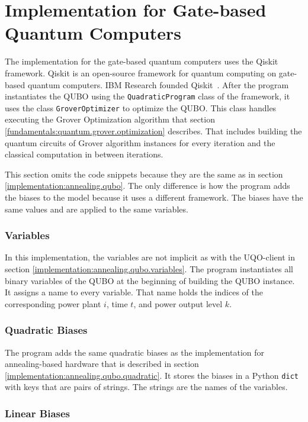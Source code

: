 \section{Implementation for Gate-based Quantum Computers}
\label{implement:gate.qubo}

The implementation for the gate-based quantum computers uses the Qiskit framework.
Qiskit is an open-source framework for quantum computing on gate-based quantum computers.
IBM Research founded Qiskit~\cite{QiskitWeb, QiskitGitHub}.
After the program instantiates the QUBO using the \texttt{QuadraticProgram} class of the framework, it uses the class \texttt{GroverOptimizer} to optimize the QUBO.
This class handles executing the Grover Optimization algorithm that section \ref{fundamentals:quantum.grover.optimization} describes.
That includes building the quantum circuits of Grover algorithm instances for every iteration and the classical computation in between iterations.

This section omits the code snippets because they are the same as in section \ref{implementation:annealing.qubo}.
The only difference is how the program adds the biases to the model because it uses a different framework.
The biases have the same values and are applied to the same variables.

\subsubsection{Variables}

In this implementation, the variables are not implicit as with the UQO-client in section \ref{implementation:annealing.qubo.variables}.
The program instantiates all binary variables of the QUBO at the beginning of building the QUBO instance.
It assigns a name to every variable.
That name holds the indices of the corresponding power plant $i$, time $t$, and power output level $k$.

\subsubsection{Quadratic Biases}

The program adds the same quadratic biases as the implementation for annealing-based hardware that is described in section \ref{implementation:annealing.qubo.quadratic}.
It stores the biases in a Python \texttt{dict} with keys that are pairs of strings.
The strings are the names of the variables.

\subsubsection{Linear Biases}

